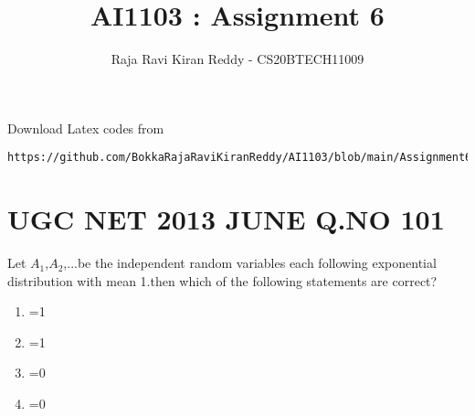 \documentclass[journal,12pt,twocolumn]{IEEEtran}
\begin{document}
\let\vec\mathbf
\renewcommand{\thefigure}{\theproblem}
\def\putbox#1#2#3{\makebox[0in][l]{\makebox[#1][l]{}\raisebox{\baselineskip}[0in][0in]{\raisebox{#2}[0in][0in]{#3}}}}
     \def\rightbox#1{\makebox[0in][r]{#1}}
     \def\centbox#1{\makebox[0in]{#1}}
     \def\topbox#1{\raisebox{-\baselineskip}[0in][0in]{#1}}
     \def\midbox#1{\raisebox{-0.5\baselineskip}[0in][0in]{#1}}
\vspace{3cm}
\title{AI1103 : Assignment 6}
\author{Raja Ravi Kiran Reddy - CS20BTECH11009}
\maketitle
\newpage
\bigskip
\renewcommand{\thefigure}{\arabic{figure}}
\renewcommand{\thetable}{\arabic{table}}

%
Download Latex codes from 
%
\begin{lstlisting}
https://github.com/BokkaRajaRaviKiranReddy/AI1103/blob/main/Assignment6/Assignment6.tex
\end{lstlisting}
\section{UGC NET 2013 JUNE Q.NO 101}
Let $A_1$,$A_2$,...be the independent random variables each following exponential distribution with mean 1.then which of the following statements are correct?

\begin{enumerate}
    \item {}=1\\
    \item {}=1\\
    \item {}=0\\
    \item {}=0
\end{enumerate}
\end{document}
